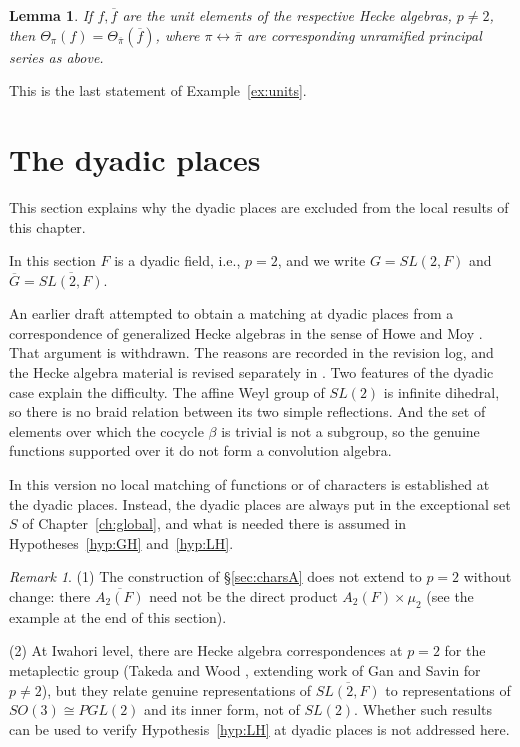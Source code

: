 \documentclass[12pt,letterpaper,openany]{book}
\theoremstyle{plain}
\newtheorem{lemma}[theorem]{Lemma}
\theoremstyle{definition}
\theoremstyle{remark}
\newtheorem{remark}[theorem]{Remark}
\theoremstyle{remark}
\begin{document}
\begin{lemma}
If $f,\overline{f}$ are the unit elements
of the respective Hecke algebras, $p\not= 2$, then
$\Theta_\pi(f)=\Theta_{\overline{\pi}}(\overline{f})$,
where
$\pi \leftrightarrow \overline{\pi}$ are corresponding
unramified principal series as above.
\end{lemma}

This is the last statement of Example~\ref{ex:units}.

\section{The dyadic places}\label{sec:dyadic}

This section explains why the dyadic places are excluded from the local results of this chapter.


In this section $F$ is a dyadic field, i.e., $p=2$, and we write
$G=SL(2,F)$ and $\overline{G}=\overline{SL(2,F)}$.

An earlier draft attempted to obtain a matching at dyadic places from a
correspondence of generalized Hecke algebras in the sense of Howe and Moy
\cite[ch.~3]{HM}. That argument is withdrawn. The reasons are recorded in
the revision log, and the Hecke algebra material is revised separately in
\cite{J3}. Two features of the dyadic case explain the difficulty. The
affine Weyl group of $SL(2)$ is infinite dihedral, so there is no braid
relation between its two simple reflections. And the set of elements over
which the cocycle $\beta$ is trivial is not a subgroup, so the genuine
functions supported over it do not form a convolution algebra.

In this version no local matching of functions or of characters is
established at the dyadic places. Instead, the dyadic places are always
put in the exceptional set $S$ of Chapter~\ref{ch:global}, and what is
needed there is assumed in Hypotheses~\ref{hyp:GH} and~\ref{hyp:LH}.

\begin{remark}
(1) The construction of \S\ref{sec:charsA} does not extend to $p=2$
without change: there $\overline{A_2(F)}$ need not be the direct product
$A_2(F)\times\mu_2$ (see the example at the end of this section).

(2) At Iwahori level, there are Hecke algebra correspondences at
$p=2$ for the metaplectic group (Takeda and Wood \cite{TW}, extending
work of Gan and Savin for $p\neq 2$), but they relate genuine
representations of $\overline{SL(2,F)}$ to representations of
$SO(3)\cong PGL(2)$ and its inner form, not of $SL(2)$. Whether such
results can be used to verify Hypothesis~\ref{hyp:LH} at dyadic places
is not addressed here.
\end{remark}
\end{document}
